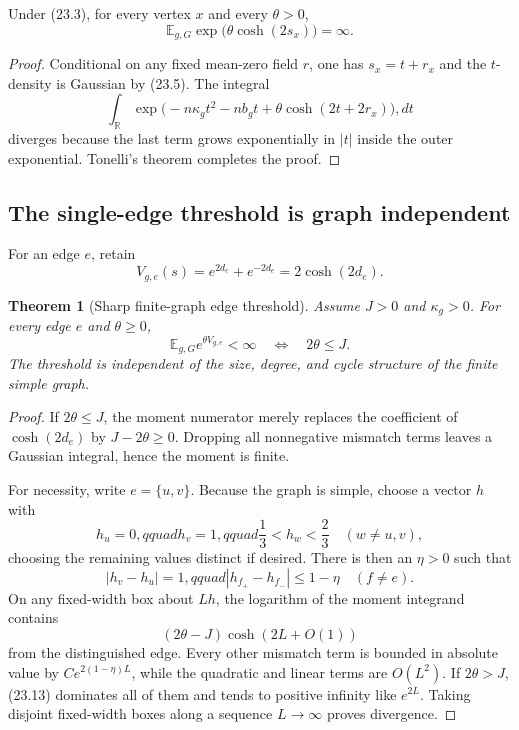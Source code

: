 \documentclass[11pt]{article}
\newtheorem{theorem}{Theorem}[section]
\theoremstyle{remark}
\begin{document}
\begin{countertheorem}
\label{ctr:v17v23-site}
Under (23.3), for every vertex \(x\) and every \(\theta>0\),
\[
 \mathbb E_{g,G}\exp\bigl(\theta\cosh(2s_x)\bigr)=\infty.
                                                               \tag{23.7}
\]
\end{countertheorem}

\begin{proof}
Conditional on any fixed mean-zero field \(r\), one has \(s_x=t+r_x\)
and the \(t\)-density is Gaussian by (23.5).  The integral
\[
 \int_{\mathbb R}
 \exp\bigl(-n\kappa_gt^2-nb_gt
 +\theta\cosh(2t+2r_x)\bigr),dt                  \tag{23.8}
\]
diverges because the last term grows exponentially in \(|t|\) inside
the outer exponential.  Tonelli's theorem completes the proof.
\end{proof}

\subsection{The single-edge threshold is graph independent}

For an edge \(e\), retain
\[
 V_{g,e}(s)=e^{2d_e}+e^{-2d_e}=2\cosh(2d_e).       \tag{23.9}
\]

\begin{theorem}[Sharp finite-graph edge threshold]
\label{thm:v17v23-edge-threshold}
Assume \(J>0\) and \(\kappa_g>0\).  For every edge \(e\) and
\(\theta\geq0\),
\[
 \mathbb E_{g,G}e^{\theta V_{g,e}}<\infty
 \quad\Longleftrightarrow\quad 2\theta\leq J.     \tag{23.10}
\]
The threshold is independent of the size, degree, and cycle structure
of the finite simple graph.
\end{theorem}

\begin{proof}
If \(2\theta\leq J\), the moment numerator merely replaces the
coefficient of \(\cosh(2d_e)\) by \(J-2\theta\geq0\).  Dropping all
nonnegative mismatch terms leaves a Gaussian integral, hence the
moment is finite.

For necessity, write \(e=\{u,v\}\).  Because the graph is simple,
choose a vector \(h\) with
\[
 h_u=0,qquad h_v=1,qquad
 \frac13<h_w<\frac23\quad(w\ne u,v),               \tag{23.11}
\]
choosing the remaining values distinct if desired.  There is then an
\(\eta>0\) such that
\[
 |h_v-h_u|=1,qquad |h_{f_+}-h_{f_-}|\leq1-\eta
 \quad(f\ne e).                                   \tag{23.12}
\]
On any fixed-width box about \(Lh\), the logarithm of the moment
integrand contains
\[
 (2\theta-J)\cosh(2L+O(1))                         \tag{23.13}
\]
from the distinguished edge.  Every other mismatch term is bounded in
absolute value by \(C e^{2(1-\eta)L}\), while the quadratic and linear
terms are \(O(L^2)\).  If \(2\theta>J\), (23.13) dominates all of them
and tends to positive infinity like \(e^{2L}\).  Taking disjoint
fixed-width boxes along a sequence \(L\to\infty\) proves divergence.
\end{proof}
\end{document}

